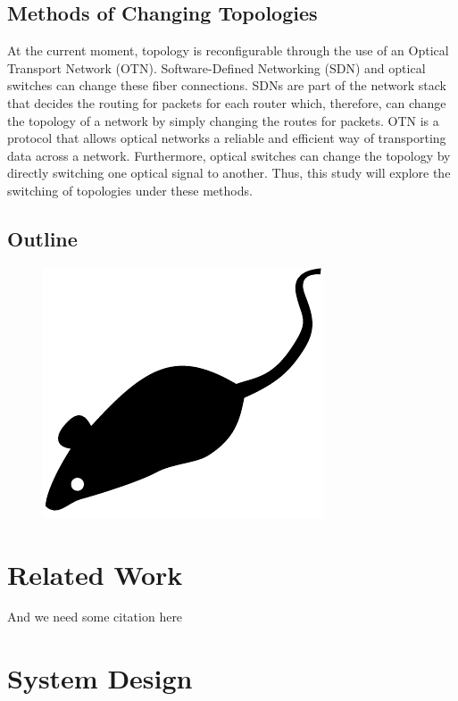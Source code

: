 \subsection{Methods of Changing Topologies}

\indent At the current moment, topology is reconfigurable through the use of an Optical Transport Network (OTN). Software-Defined Networking (SDN) and optical switches can change these fiber connections. SDNs are part of the network stack that decides the routing for packets for each router which, therefore, can change the topology of a network by simply changing the routes for packets. OTN is a protocol that allows optical networks a reliable and efficient way of transporting data across a network. Furthermore, optical switches can change the topology by directly switching one optical signal to another. Thus, this study will explore the switching of topologies under these methods.

\subsection{Outline}



\begin{figure}[tp]
\centering
\includegraphics{figures/mouse}
\caption{\blindtext}
\end{figure}

\section{Related Work}

And we need some citation here\cite{floyd1993random, stoica2001chord}


\section{System Design}

